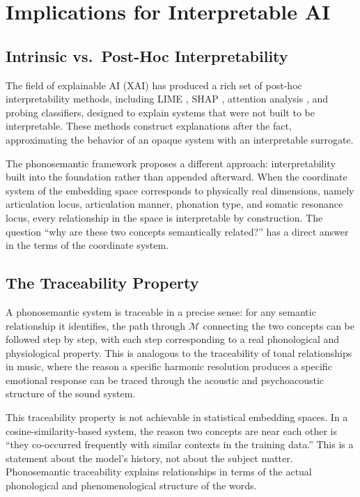 \documentclass[12pt]{article}
\begin{document}
\section{Implications for Interpretable AI}

\subsection{Intrinsic vs.\ Post-Hoc Interpretability}

The field of explainable AI (XAI) has produced a rich set of post-hoc interpretability methods, including LIME \citep{ribeiro2016}, SHAP \citep{lundberg2017}, attention analysis \citep{jain2019}, and probing classifiers, designed to explain systems that were not built to be interpretable. These methods construct explanations after the fact, approximating the behavior of an opaque system with an interpretable surrogate.

The phonosemantic framework proposes a different approach: interpretability built into the foundation rather than appended afterward. When the coordinate system of the embedding space corresponds to physically real dimensions, namely articulation locus, articulation manner, phonation type, and somatic resonance locus, every relationship in the space is interpretable by construction. The question ``why are these two concepts semantically related?'' has a direct answer in the terms of the coordinate system.

\subsection{The Traceability Property}

A phonosemantic system is traceable in a precise sense: for any semantic relationship it identifies, the path through $\mathcal{M}$ connecting the two concepts can be followed step by step, with each step corresponding to a real phonological and physiological property. This is analogous to the traceability of tonal relationships in music, where the reason a specific harmonic resolution produces a specific emotional response can be traced through the acoustic and psychoacoustic structure of the sound system.

This traceability property is not achievable in statistical embedding spaces. In a cosine-similarity-based system, the reason two concepts are near each other is ``they co-occurred frequently with similar contexts in the training data.'' This is a statement about the model's history, not about the subject matter. Phonosemantic traceability explains relationships in terms of the actual phonological and phenomenological structure of the words.
\end{document}
